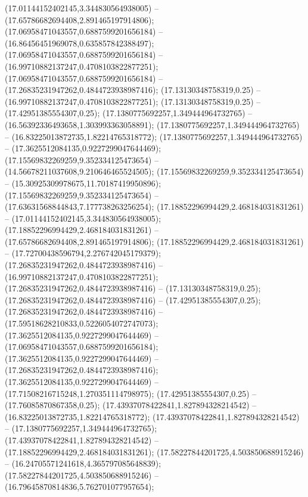  (17.01144152402145,3.344830564938005) -- (17.65786682694408,2.891465197914806);
 (17.06958471043557,0.6887599201656184) -- (16.86456451969078,0.635857842388497);
 (17.06958471043557,0.6887599201656184) -- (16.99710882137247,0.4708103822877251);
 (17.06958471043557,0.6887599201656184) -- (17.26835231947262,0.4844723938987416);
 (17.13130348758319,0.25) -- (16.99710882137247,0.4708103822877251);
 (17.13130348758319,0.25) -- (17.42951385554307,0.25);
 (17.1380775692257,1.349444964732765) -- (16.56392336493658,1.303993363058891);
 (17.1380775692257,1.349444964732765) -- (16.83225013872735,1.82214765318772);
 (17.1380775692257,1.349444964732765) -- (17.3625512084135,0.9227299047644469);
 (17.15569832269259,9.352334125473654) -- (14.56678211037608,9.210646465524505);
 (17.15569832269259,9.352334125473654) -- (15.30925309978675,11.70187419950896);
 (17.15569832269259,9.352334125473654) -- (17.63631568844843,7.177738263256254);
 (17.18852296994429,2.468184031831261) -- (17.01144152402145,3.344830564938005);
 (17.18852296994429,2.468184031831261) -- (17.65786682694408,2.891465197914806);
 (17.18852296994429,2.468184031831261) -- (17.72700438596794,2.276742045179379);
 (17.26835231947262,0.4844723938987416) -- (16.99710882137247,0.4708103822877251);
 (17.26835231947262,0.4844723938987416) -- (17.13130348758319,0.25);
 (17.26835231947262,0.4844723938987416) -- (17.42951385554307,0.25);
 (17.26835231947262,0.4844723938987416) -- (17.59518628210833,0.5226054072747073);
 (17.3625512084135,0.9227299047644469) -- (17.06958471043557,0.6887599201656184);
 (17.3625512084135,0.9227299047644469) -- (17.26835231947262,0.4844723938987416);
 (17.3625512084135,0.9227299047644469) -- (17.71508216715248,1.270351114798975);
 (17.42951385554307,0.25) -- (17.76085870867358,0.25);
 (17.43937078422841,1.827894328214542) -- (16.83225013872735,1.82214765318772);
 (17.43937078422841,1.827894328214542) -- (17.1380775692257,1.349444964732765);
 (17.43937078422841,1.827894328214542) -- (17.18852296994429,2.468184031831261);
 (17.58227844201725,4.503850688915246) -- (16.24705571241618,4.365797085648839);
 (17.58227844201725,4.503850688915246) -- (16.79645870814836,5.762701077957654);
